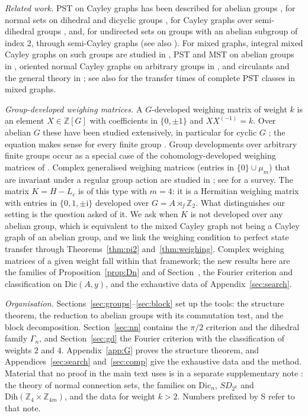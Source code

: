 \documentclass[preprint,11pt]{elsarticle}
\makeatletter
\theoremstyle{definition}
\theoremstyle{remark}
\newcommand{\Z}{\mathbb Z}
\newcommand{\ii}{\mathrm i}
\newcommand{\SR}[1]{\@nameuse{SR@#1}}
\makeatother
\begin{document}
\emph{Related work.} PST on Cayley graphs has been described for abelian groups \cite{Basic,ArnadottirGodsil,TFC}, for normal sets on dihedral and dicyclic groups \cite{CF,DihNew,ASG}, for Cayley graphs over semi-dihedral groups \cite{LCWW}, and, for undirected sets on groups with an abelian subgroup of index $2$, through semi-Cayley graphs \cite{Arezoomand} (see also \cite{WangFeng}). For mixed graphs, integral mixed Cayley graphs on such groups are studied in \cite{BehajainaLegrand}, PST and MST on abelian groups in \cite{KG}, oriented normal Cayley graphs on arbitrary groups in \cite{CPRS}, and circulants and the general theory in \cite{SongOriented,SongLin,SongLinEJC,GodsilLato,Cameron,Acuaviva}; see also \cite{SongClasses} for the transfer times of complete PST classes in mixed graphs.

\emph{Group-developed weighing matrices.} A $G$-developed weighing matrix of weight $k$ is an element $X\in\Z[G]$ with coefficients in $\{0,\pm1\}$ and $XX^{(-1)}=k$. Over abelian $G$ these have been studied extensively, in particular for cyclic $G$ \cite{AH}; the equation makes sense for every finite group \cite{LS}. Group developments over arbitrary finite groups occur as a special case of the cohomology-developed weighing matrices of \cite{GD}. Complex generalised weighing matrices (entries in $\{0\}\cup\mu_m$) that are invariant under a regular group action are studied in \cite{CdL}; see \cite{Egan} for a survey. The matrix $K=H-L_c$ is of this type with $m=4$: it is a Hermitian weighing matrix with entries in $\{0,1,\pm\ii\}$ developed over $G=A\rtimes_f\Z_2$. What distinguishes our setting is the question asked of it. We ask when $K$ is not developed over any abelian group, which is equivalent to the mixed Cayley graph not being a Cayley graph of an abelian group, and we link the weighing condition to perfect state transfer through Theorems~\ref{thm:pi2} and~\ref{thm:weighing}. Complex weighing matrices of a given weight fall within that framework; the new results here are the families of Proposition~\ref{prop:Dn} and of Section~\SR{app:fam}, the Fourier criterion and classification on $\mathrm{Dic}(A,y)$, and the exhaustive data of Appendix~\ref{sec:search}.

\emph{Organisation.} Sections~\ref{sec:groups}--\ref{sec:block} set up the tools: the structure theorem, the reduction to abelian groups with its commutation test, and the block decomposition. Section~\ref{sec:nn} contains the $\pi/2$ criterion and the dihedral family $\Gamma_n$, and Section~\ref{sec:gd} the Fourier criterion with the classification of weights $2$ and $4$. Appendix~\ref{app:G} proves the structure theorem, and Appendices~\ref{sec:search} and~\ref{sec:comp} give the exhaustive data and the method. Material that no proof in the main text uses is in a separate supplementary note \cite{Supp}: the theory of normal connection sets, the families on $\mathrm{Dic}_n$, $SD_{2^k}$ and $\mathrm{Dih}(\Z_4\times\Z_{4m})$, and the data for weight $k>2$. Numbers prefixed by S refer to that note.
\end{document}

